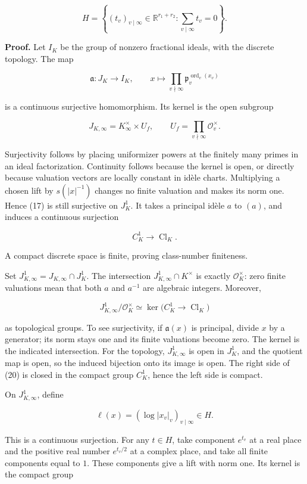 \documentclass[
  english,
  11pt,
  a4paper,
]{article}
\begin{document}
\[H=\left\{(t_v)_{v\mid\infty}\in\mathbb R^{r_1+r_2}:
\sum_{v\mid\infty}t_v=0\right\}.
\tag{16}\]

\textbf{Proof.} Let \(I_K\) be the group of nonzero fractional ideals,
with the discrete topology. The map

\[\mathfrak a:J_K\longrightarrow I_K,
\qquad x\longmapsto\prod_{v\nmid\infty}\mathfrak p_v^{\operatorname{ord}_v(x_v)}
\tag{17}\]

is a continuous surjective homomorphism. Its kernel is the open subgroup

\[J_{K,\infty}=K_\infty^\times\times U_f,
\qquad U_f=\prod_{v\nmid\infty}\mathcal O_v^\times.
\tag{18}\]

Surjectivity follows by placing uniformizer powers at the finitely many
primes in an ideal factorization. Continuity follows because the kernel
is open, or directly because valuation vectors are locally constant in
idèle charts. Multiplying a chosen lift by \(s(|x|^{-1})\) changes no
finite valuation and makes its norm one. Hence (17) is still surjective
on \(J_K^1\). It takes a principal idèle \(a\) to \((a)\), and induces a
continuous surjection

\[C_K^1\longrightarrow\operatorname{Cl}_K.
\tag{19}\]

A compact discrete space is finite, proving class-number finiteness.

Set \(J_{K,\infty}^1=J_{K,\infty}\cap J_K^1\). The intersection
\(J_{K,\infty}^1\cap K^\times\) is exactly \(\mathcal O_K^\times\): zero
finite valuations mean that both \(a\) and \(a^{-1}\) are algebraic
integers. Moreover,

\[J_{K,\infty}^1/\mathcal O_K^\times
\simeq \ker\bigl(C_K^1\to\operatorname{Cl}_K\bigr)
\tag{20}\]

as topological groups. To see surjectivity, if \(\mathfrak a(x)\) is
principal, divide \(x\) by a generator; its norm stays one and its
finite valuations become zero. The kernel is the indicated intersection.
For the topology, \(J_{K,\infty}^1\) is open in \(J_K^1\), and the
quotient map is open, so the induced bijection onto its image is open.
The right side of (20) is closed in the compact group \(C_K^1\), hence
the left side is compact.

On \(J_{K,\infty}^1\), define

\[\ell(x)=(\log|x_v|_v)_{v\mid\infty}\in H.
\tag{21}\]

This is a continuous surjection. For any \(t\in H\), take component
\(e^{t_v}\) at a real place and the positive real number \(e^{t_v/2}\)
at a complex place, and take all finite components equal to \(1\). These
components give a lift with norm one. Its kernel is the compact group
\end{document}
